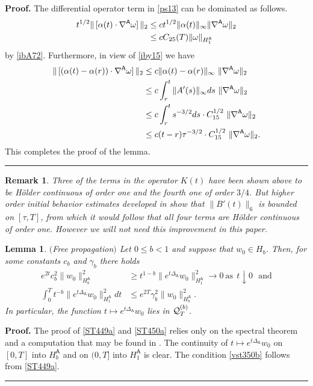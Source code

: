 \documentclass[12pt]{article}
\newtheorem{lemma}[theorem]{Lemma}
\newtheorem{remark}[theorem]{Remark}
\newenvironment{proof}[1][Proof]{\textbf{#1.} }{\ \rule{0.5em}{0.5em}}
\def \As{\mathsf{A}}
\def \Q{{\cal Q}}
\def \w{\omega}
\def \n{\nabla}
\def \eref{\eqref}
\numberwithin{equation}{section}
\begin{document}
\begin{proof}
  The differential operator term in \eref{ps13} can be dominated as follows.
  \begin{align*}
  t^{1/2}\|\, [\alpha(t)\cdot \n^\As \w]\, \|_2 &\le c t^{1/2}\|\alpha(t)\|_\infty \|\n^\As \w\|_2  \notag\\
  &\le  c C_{25}(T) \| \w\|_{H_1^\As}
  \end{align*}
  by \eref{ibA72}.  Furthermore, in view of \eref{iby15} we have
  \begin{align}
  \|\, [(\alpha(t)- \alpha(r))\cdot \n^\As \w]\, \|_2
  &\le c \|\alpha(t)- \alpha(r)\|_\infty \   \|\n^\As \w\|_2 \notag\\
  &\le c \int_r^t \|A'(s)\|_\infty ds \  \|\n^\As \w\|_2 \notag\\
  &\le c \int_r^t s^{-3/2} ds  \cdot C_{15}^{1/2}  \  \|\n^\As \w\|_2 \notag\\
  &\le c (t-r) \tau^{-3/2} \cdot  C_{15}^{1/2}   \  \|\n^\As \w\|_2. \notag
  \end{align}
  This completes the proof of the  lemma.   
     \end{proof}
     
     
     \begin{remark}{\rm 
     Three of the terms in the operator $K(t)$  have been shown above to be 
     H\"older continuous of order one and the fourth one of order $3/4$. But higher order 
     initial behavior estimates developed in \cite{CG3} show that $\|B'(t)\|_6$ is bounded 
     on $[\tau, T]$, from which it would follow that all four terms are H\"older continuous of order one.
     However we will not need this improvement in this paper.
     }
     \end{remark}

 
                \begin{lemma}\label{freeprop}   $($Free propagation$)$
          Let  $ 0 \le b <1$ and suppose that  $w_0 \in H_b$. 
Then, for some constants $c_b$ and $\gamma_b$ there holds
\begin{align}
e^{2t} c_b^2 \|w_0\|_{H_b^\As}^2 &\ge t^{1-b} 
\|e^{t\Delta_\As} w_0\|_{H_1^\As}^2 \rightarrow 0\ \text{as}\ \ t\downarrow 0\ \ \ \text{and} \label{ST449a} \\
\int_0^T t^{-b} \|e^{t\Delta_\As} w_0\|_{H_1^\As}^2 dt 
         &\le e^{2T} \gamma_b^2 \|w_0\|_{H_b^\As}^2.              \label{ST450a} 
\end{align}
In particular, the function $t\mapsto e^{t\Delta_\As} w_0$ lies in $\Q_T^{(b)}$.
\end{lemma}
            \begin{proof}
The proof of \eref{ST449a} and \eref{ST450a} relies only on the spectral
  theorem and  a computation that may be found in \cite[Lemma 3.4] {G70}. 
  The continuity of    $t\mapsto e^{t\Delta_\As} w_0$ on $[0,T]$ into $H_b^\As$ and on $(0,T]$ into $H_1^\As$
  is clear.  The condition \eref{vst350b} follows from  \eref{ST449a}.
\end{proof}
\end{document}
